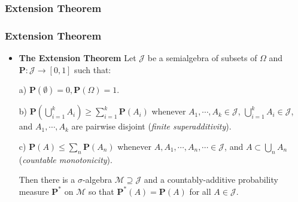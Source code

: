 \documentclass[%
]{beamer}
\newcommand{\BP}{\mathbf{P}}
\begin{document}
\subsubsection{Extension Theorem}
\frame
{
  \frametitle{Extension Theorem}

   \begin{itemize}

             \item<1-> [] \begin{Theorem} \textbf{The Extension Theorem}  Let $\mathcal{J}$ be a semialgebra of subsets of $\Omega$ and $\mathbf{P} : \mathcal{J} \to [0,1]$ such that:
             \newline
             
             a) $\mathbf{P} (\emptyset)=0, \mathbf{P}(\Omega)=1$.
                 \newline
         
             b) $\BP(\bigcup_{i=1}^k A_i)\geq \sum_{i=1}^k \BP(A_i)$ whenever $A_1,\cdots,A_k \in\mathcal{J}$, $\bigcup_{i=1}^k A_i  \in\mathcal{J}$, and $A_1,\cdots,A_k$ are pairwise disjoint (\textit{finite superadditivity}).
                   \newline
       
             c) $\BP(A)\leq \sum_{n} \BP(A_n)$ whenever $A,A_1,\cdots,A_n,\cdots \in\mathcal{J}$, and $A\subset \bigcup_{n} A_n$ (\textit{countable monotonicity}).               
             \newline
             
             Then there is a $\sigma$-algebra $\mathcal{M} \supseteq \mathcal{J}$ and a countably-additive probability measure $\BP^*$ on $\mathcal{M}$ so that $\BP^*(A)=\BP(A)$ for all $A\in \mathcal{J}$.
             \end{Theorem}    
       
                
                 \end{itemize}
}
\end{document}
